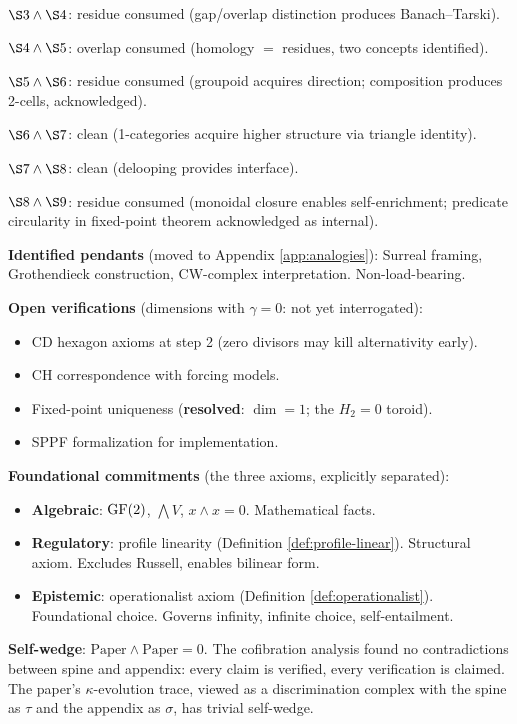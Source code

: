 $\S3 \wedge \S4$: residue consumed (gap/overlap
distinction produces Banach--Tarski).

$\S4 \wedge \S5$: overlap consumed (homology $=$
residues, two concepts identified).

$\S5 \wedge \S6$: residue consumed (groupoid acquires
direction; composition produces 2-cells, acknowledged).

$\S6 \wedge \S7$: clean (1-categories acquire higher
structure via triangle identity).

$\S7 \wedge \S8$: clean (delooping provides interface).

$\S8 \wedge \S9$: residue consumed (monoidal closure
enables self-enrichment; predicate circularity in
fixed-point theorem acknowledged as internal).

\medskip
\noindent\textbf{Identified pendants} (moved to
Appendix \ref{app:analogies}): Surreal framing,
Grothendieck construction, CW-complex interpretation.
Non-load-bearing.

\medskip
\noindent\textbf{Open verifications} (dimensions with
$\gamma = 0$: not yet interrogated):
\begin{itemize}[nosep]
  \item CD hexagon axioms at step 2 (zero divisors may
    kill alternativity early).
  \item CH correspondence with forcing models.
  \item Fixed-point uniqueness (\textbf{resolved}: $\dim = 1$; the $H_2 = 0$
    toroid).
  \item SPPF formalization for implementation.
\end{itemize}

\medskip
\noindent\textbf{Foundational commitments} (the three
axioms, explicitly separated):
\begin{itemize}[nosep]
  \item \textbf{Algebraic}: $\operatorname{GF}(2)$, $\bigwedge V$,
    $x \wedge x = 0$. Mathematical facts.
  \item \textbf{Regulatory}: profile linearity
    (Definition \ref{def:profile-linear}). Structural
    axiom. Excludes Russell, enables bilinear form.
  \item \textbf{Epistemic}: operationalist axiom
    (Definition \ref{def:operationalist}). Foundational
    choice. Governs infinity, infinite choice,
    self-entailment.
\end{itemize}

\medskip
\noindent\textbf{Self-wedge}: $\text{Paper} \wedge
\text{Paper} = 0$. The cofibration analysis found
no contradictions between spine and appendix: every
claim is verified, every verification is claimed.
The paper's $\kappa$-evolution trace, viewed as a
discrimination complex with the spine as $\tau$ and
the appendix as $\sigma$, has trivial self-wedge.

